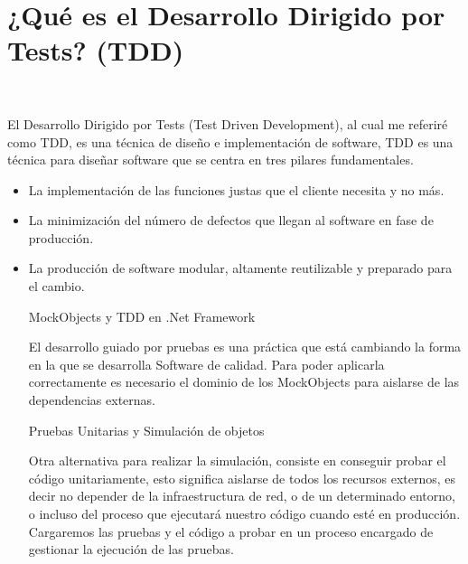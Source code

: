 \section{¿Qué es el Desarrollo Dirigido por Tests? (TDD)} 
\textbf{}\\
\begin{flushleft}
El Desarrollo Dirigido por Tests (Test Driven Development), al cual me referiré como TDD, es una técnica de diseño e implementación de software,
TDD es una técnica para diseñar software que se centra en tres pilares fundamentales.

\begin{itemize}


\item  La implementación de las funciones justas que el cliente necesita y no más.

\item  La minimización del número de defectos que llegan al software en fase de producción.

\item La producción de software modular, altamente reutilizable y preparado para el cambio.



MockObjects y TDD en .Net Framework


El desarrollo guiado por pruebas es una práctica que está cambiando la forma en la que se desarrolla Software de calidad. Para poder aplicarla correctamente es necesario el dominio de los MockObjects para aislarse de las dependencias externas.


Pruebas Unitarias y Simulación de objetos

Otra alternativa para realizar la simulación, consiste en conseguir probar el código unitariamente, esto significa aislarse de todos los recursos externos, es decir no depender de la infraestructura de red, o de un determinado entorno, o incluso del proceso que ejecutará nuestro código cuando esté en producción. Cargaremos las pruebas y el código a probar en un proceso encargado de gestionar la ejecución de las pruebas.

\end{itemize} 


\end{flushleft}